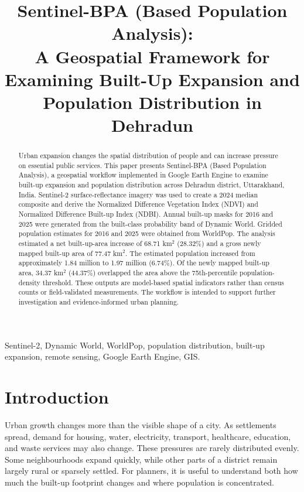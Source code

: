\documentclass[conference]{IEEEtran}
\begin{document}
\title{Sentinel-BPA (Based Population Analysis):\\ A Geospatial Framework for Examining Built-Up Expansion and Population Distribution in Dehradun}
\author{
}
\maketitle

\begin{abstract}
Urban expansion changes the spatial distribution of people and can increase pressure on essential public services. This paper presents Sentinel-BPA (Based Population Analysis), a geospatial workflow implemented in Google Earth Engine to examine built-up expansion and population distribution across Dehradun district, Uttarakhand, India. Sentinel-2 surface-reflectance imagery was used to create a 2024 median composite and derive the Normalized Difference Vegetation Index (NDVI) and Normalized Difference Built-up Index (NDBI). Annual built-up masks for 2016 and 2025 were generated from the built-class probability band of Dynamic World. Gridded population estimates for 2016 and 2025 were obtained from WorldPop. The analysis estimated a net built-up-area increase of 68.71 km$^2$ (28.32\%) and a gross newly mapped built-up area of 77.47 km$^2$. The estimated population increased from approximately 1.84 million to 1.97 million (6.74\%). Of the newly mapped built-up area, 34.37 km$^2$ (44.37\%) overlapped the area above the 75th-percentile population-density threshold. These outputs are model-based spatial indicators rather than census counts or field-validated measurements. The workflow is intended to support further investigation and evidence-informed urban planning.
\end{abstract}
\begin{IEEEkeywords}
Sentinel-2, Dynamic World, WorldPop, population distribution, built-up expansion, remote sensing, Google Earth Engine, GIS.
\end{IEEEkeywords}

\section{Introduction}
Urban growth changes more than the visible shape of a city. As settlements spread, demand for housing, water, electricity, transport, healthcare, education, and waste services may also change. These pressures are rarely distributed evenly. Some neighbourhoods expand quickly, while other parts of a district remain largely rural or sparsely settled. For planners, it is useful to understand both how much the built-up footprint changes and where population is concentrated.
\end{document}
